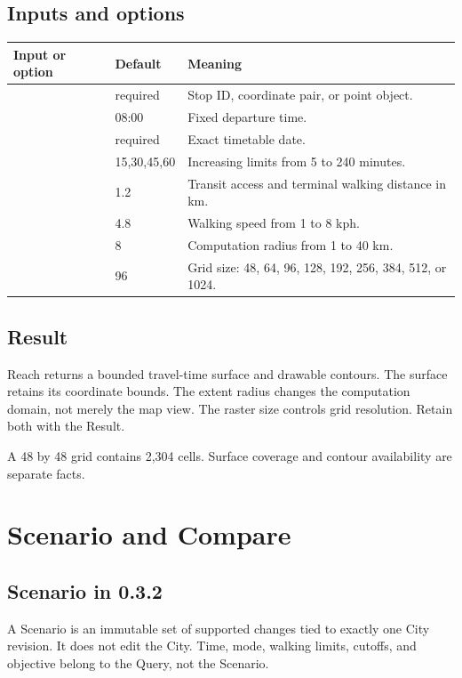 \documentclass[10pt,letterpaper]{article}
\begin{document}
\subsection{Inputs and options}

\begin{longtable}{P{1.62in} P{1.08in} P{3.60in}}
\toprule
\textbf{Input or option} & \textbf{Default} & \textbf{Meaning} \\
\midrule
\endhead
{} & required & Stop ID, coordinate pair, or point object. \\
 & 08:00 & Fixed departure time. \\
 & required & Exact timetable date. \\
 & 15,30,45,60 & Increasing limits from 5 to 240 minutes. \\
 & 1.2 & Transit access and terminal walking distance in km. \\
 & 4.8 & Walking speed from 1 to 8 kph. \\
 & 8 & Computation radius from 1 to 40 km. \\
 & 96 & Grid size: 48, 64, 96, 128, 192, 256, 384, 512, or 1024. \\
\bottomrule
\end{longtable}

\subsection{Result}

Reach returns a bounded travel-time surface and drawable contours. The surface retains its coordinate bounds. The extent radius changes the computation domain, not merely the map view. The raster size controls grid resolution. Retain both with the Result.

A 48 by 48 grid contains 2,304 cells. Surface coverage and contour availability are separate facts.

\section{Scenario and Compare}

\subsection{Scenario in 0.3.2}

A Scenario is an immutable set of supported changes tied to exactly one City revision. It does not edit the City. Time, mode, walking limits, cutoffs, and objective belong to the Query, not the Scenario.
\end{document}
